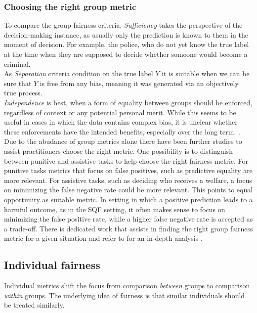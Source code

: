 \subsubsection*{Choosing the right group metric}
To compare the group fairness criteria, \textit{Sufficiency} takes the perspective of the decision-making instance, as usually only the prediction is known to them in the moment of decision. For example, the police, who do not yet know the true label at the time when they are supposed to decide whether someone would become a criminal.\\
As \textit{Separation} criteria condition on the true label $Y$ it is suitable when we can be sure that $Y$ is free from any bias, meaning it was generated via an objectively true process. \\
\textit{Independence} is best, when a form of equality between groups should be enforced, regardless of context or any potential personal merit. While this seems to be useful in cases in which the data contains complex bias, it is unclear whether these enforcements have the intended benefits, especially over the long term. {\color{red}{Reference?}}.\\

Due to the abudance of group metrics alone there have been further studies to assist practitioners choose the right metric. One possibility is to distinguish between punitive and assistive tasks to help choose the right fairness metric. For punitive tasks metrics that focus on false positives, such as predictive equality are more relevant. For assistive tasks, such as deciding who receives a welfare, a focus on minimizing the false negative rate could be more relevant. This points to equal opportunity as suitable metric.
In setting in which a positive prediction leads to a harmful outcome, as in the SQF setting, it often makes sense to focus on minimizing the false positive rate, while a higher false negative rate is accepted as a trade-off.
There is dedicated work that assists in finding the right group fairness metric for a given situation and refer to for an in-depth analysis \cite{makhlouf2021}.

\subsection{Individual fairness}
Individual metrics shift the focus from comparison \textit{between} groups to comparison \textit{within} groups. The underlying idea of fairness is that similar individuals should be treated similarly.


